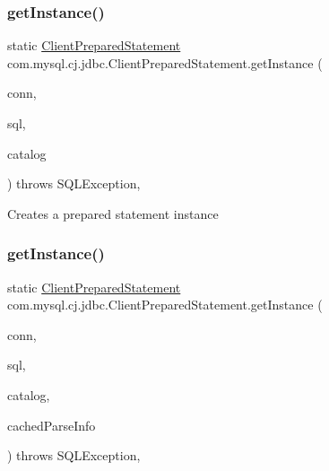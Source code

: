 \subsubsection{\texorpdfstring{get\+Instance()}{getInstance()}\hspace{0.1cm}{\footnotesize\ttfamily [1/2]}}
{\footnotesize\ttfamily static \mbox{\hyperlink{classcom_1_1mysql_1_1cj_1_1jdbc_1_1_client_prepared_statement}{Client\+Prepared\+Statement}} com.\+mysql.\+cj.\+jdbc.\+Client\+Prepared\+Statement.\+get\+Instance (\begin{DoxyParamCaption}\item[{\mbox{\hyperlink{interfacecom_1_1mysql_1_1cj_1_1jdbc_1_1_jdbc_connection}{Jdbc\+Connection}}}]{conn,  }\item[{String}]{sql,  }\item[{String}]{catalog }\end{DoxyParamCaption}) throws S\+Q\+L\+Exception\hspace{0.3cm}{\ttfamily [static]}, {\ttfamily [protected]}}

Creates a prepared statement instance \mbox{\label{classcom_1_1mysql_1_1cj_1_1jdbc_1_1_client_prepared_statement_a5b030cdd8620573bcb233f877acc30b5}} 
\subsubsection{\texorpdfstring{get\+Instance()}{getInstance()}\hspace{0.1cm}{\footnotesize\ttfamily [2/2]}}
{\footnotesize\ttfamily static \mbox{\hyperlink{classcom_1_1mysql_1_1cj_1_1jdbc_1_1_client_prepared_statement}{Client\+Prepared\+Statement}} com.\+mysql.\+cj.\+jdbc.\+Client\+Prepared\+Statement.\+get\+Instance (\begin{DoxyParamCaption}\item[{\mbox{\hyperlink{interfacecom_1_1mysql_1_1cj_1_1jdbc_1_1_jdbc_connection}{Jdbc\+Connection}}}]{conn,  }\item[{String}]{sql,  }\item[{String}]{catalog,  }\item[{\mbox{\hyperlink{classcom_1_1mysql_1_1cj_1_1_parse_info}{Parse\+Info}}}]{cached\+Parse\+Info }\end{DoxyParamCaption}) throws S\+Q\+L\+Exception\hspace{0.3cm}{\ttfamily [static]}, {\ttfamily [protected]}}

